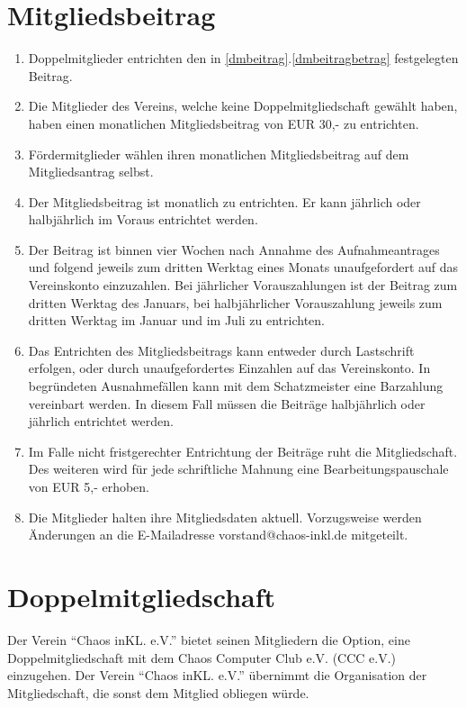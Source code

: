 \documentclass[a4paper, 12pt]{scrartcl}
\begin{document}
\section{Mitgliedsbeitrag}
\begin{enumerate}
	\item Doppelmitglieder entrichten den in \ref{dmbeitrag}.\ref{dmbeitragbetrag} festgelegten Beitrag.
	\item Die Mitglieder des Vereins, welche keine Doppelmitgliedschaft gewählt haben, haben einen monatlichen
    Mitgliedsbeitrag von EUR 30,- zu entrichten.
	\item Fördermitglieder wählen ihren monatlichen Mitgliedsbeitrag auf dem Mitgliedsantrag selbst.
	\item Der Mitgliedsbeitrag ist monatlich zu entrichten. Er kann jährlich oder halbjährlich im Voraus entrichtet werden.
	\item Der Beitrag ist binnen vier Wochen nach Annahme des Aufnahmeantrages und folgend jeweils zum dritten Werktag eines Monats unaufgefordert auf das Vereinskonto einzuzahlen. Bei jährlicher Vorauszahlungen ist der Beitrag zum dritten Werktag des Januars, bei halbjährlicher Vorauszahlung jeweils zum dritten Werktag im Januar und im Juli zu entrichten.
	\item Das Entrichten des Mitgliedsbeitrags kann entweder durch Lastschrift erfolgen, oder durch unaufgefordertes Einzahlen auf das Vereinskonto. In begründeten Ausnahmefällen kann mit dem Schatzmeister eine Barzahlung vereinbart werden. In diesem Fall müssen die Beiträge halbjährlich oder jährlich entrichtet werden.
	\item Im Falle nicht fristgerechter Entrichtung der Beiträge ruht die Mitgliedschaft. Des weiteren wird für jede schriftliche Mahnung eine Bearbeitungspauschale von EUR 5,- erhoben.
	\item Die Mitglieder halten ihre Mitgliedsdaten aktuell. Vorzugsweise
    werden Änderungen an die E-Mailadresse
    vorstand@chaos-inkl.de mitgeteilt. 
\end{enumerate}

\section{Doppelmitgliedschaft}\label{dm}
Der Verein "`Chaos inKL. e.V."' bietet seinen Mitgliedern die Option, eine Doppelmitgliedschaft mit dem Chaos Computer Club e.V. (CCC e.V.) einzugehen. Der Verein "`Chaos inKL. e.V."' übernimmt die Organisation der Mitgliedschaft, die sonst dem Mitglied obliegen würde.
\end{document}
